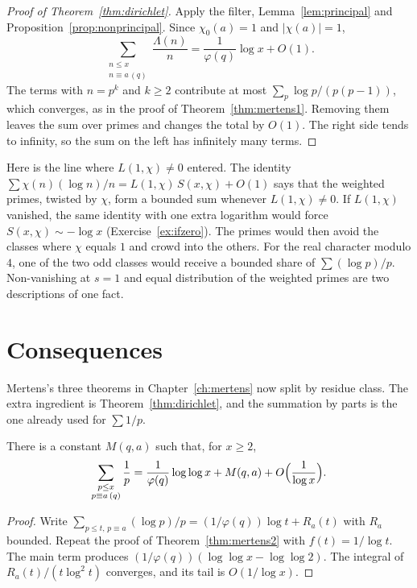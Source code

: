 \begin{proof}[Proof of Theorem~\ref{thm:dirichlet}]
Apply the filter, Lemma~\ref{lem:principal} and Proposition~\ref{prop:nonprincipal}. Since $\chi_0(a)=1$ and $|\chi(a)|=1$,
\[
\sum_{\substack{n\le x\\n\equiv a\,(q)}}\frac{\Lambda(n)}n=\frac1{\varphi(q)}\log x+O(1).
\]
The terms with $n=p^k$ and $k\ge2$ contribute at most $\sum_p\log p/(p(p-1))$, which converges, as in the proof of Theorem~\ref{thm:mertens1}. Removing them leaves the sum over primes and changes the total by $O(1)$. The right side tends to infinity, so the sum on the left has infinitely many terms.
\end{proof}

\begin{beauty}
Here is the line where $L(1,\chi)\ne0$ entered. The identity $\sum\chi(n)(\log n)/n=L(1,\chi)\,S(x,\chi)+O(1)$ says that the weighted primes, twisted by $\chi$, form a bounded sum whenever $L(1,\chi)\ne0$. If $L(1,\chi)$ vanished, the same identity with one extra logarithm would force $S(x,\chi)\sim-\log x$ (Exercise~\ref{ex:ifzero}). The primes would then avoid the classes where $\chi$ equals $1$ and crowd into the others. For the real character modulo $4$, one of the two odd classes would receive a bounded share of $\sum(\log p)/p$. Non-vanishing at $s=1$ and equal distribution of the weighted primes are two descriptions of one fact.
\end{beauty}

\section{Consequences}

Mertens's three theorems in Chapter~\ref{ch:mertens} now split by residue class. The extra ingredient is Theorem~\ref{thm:dirichlet}, and the summation by parts is the one already used for $\sum 1/p$.

\begin{corollary}\label{cor:recipprog}
There is a constant $M(q,a)$ such that, for $x\ge2$,
\[
\sum_{\substack{p\le x\\p\equiv a\,(q)}}\frac1p=\frac1{\varphi(q)}\log\log x+M(q,a)+O\Bigl(\frac1{\log x}\Bigr).
\]
\end{corollary}
\begin{proof}
Write $\sum_{p\le t,\,p\equiv a}(\log p)/p=(1/\varphi(q))\log t+R_a(t)$ with $R_a$ bounded. Repeat the proof of Theorem~\ref{thm:mertens2} with $f(t)=1/\log t$. The main term produces $(1/\varphi(q))(\log\log x-\log\log 2)$. The integral of $R_a(t)/(t\log^2 t)$ converges, and its tail is $O(1/\log x)$.
\end{proof}

